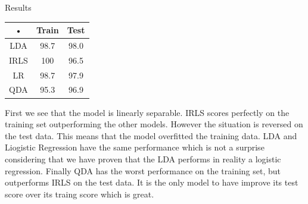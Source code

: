 \documentclass[a4paper]{article}
\begin{document}
\begin{minipage}[c]{0,35\textwidth}
Results\\
\begin{tabular}{|c|c|c|}
\hline 
• & Train & Test \\ 
\hline 
LDA & 98.7 & 98.0 \\ 
\hline 
IRLS & 100 & 96.5 \\ 
\hline 
LR & 98.7 & 97.9 \\ 
\hline 
QDA & 95.3 & 96.9 \\ 
\hline 
\end{tabular} 
\end{minipage}
\begin{minipage}{0,6\textwidth}
First we see that the model is linearly separable. IRLS scores perfectly on the training set outperforming the other models. However the situation is reversed on the test data. This means that the model overfitted the training data. LDA and Liogistic Regression have the same performance which is not a surprise considering that we have proven that the LDA performs in reality a logistic regression. Finally QDA has the worst performance on the training set, but outperforms IRLS on the test data. It is the only model to have improve its test score over its traing score which is great.
\end{minipage}
\newpage
\end{document}
